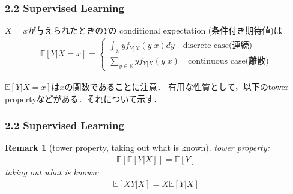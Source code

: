 \documentclass[dvipdfmx,cjk]{beamer}
\theoremstyle{example}
\newtheorem{remark}[thm]{Remark}
\begin{document}
\begin{frame}
    \frametitle{2.2 Supervised Learning}

    \begin{definition}
        $X=x$が与えられたときの$Y$の conditional expectation (条件付き期待値)は
        \begin{align*}
            \mathbb{E}[Y|X=x] =\begin{cases}
                                   \int_\mathbb{R}yf_{Y|X}(y|x)dy \quad \text{discrete case(連続)} \\
                                   \sum_{y\in\mathbb{R}}yf_{Y|X}(y|x)\quad \text{continuous case(離散)}
                               \end{cases}
        \end{align*}
    \end{definition}
    $\mathbb{E}[Y|X=x]$は$x$の関数であることに注意．
    有用な性質として，以下のtower propertyなどがある．それについて示す．
\end{frame}

\begin{frame}
    \frametitle{2.2 Supervised Learning}
    \begin{remark}[tower property, taking out what is known]
        tower property:
        \begin{align*}
            \mathbb{E}[\mathbb{E}[Y|X]] = \mathbb{E}[Y]
        \end{align*}
        taking out what is known:
        \begin{align*}
            \mathbb{E}[XY|X]=X\mathbb{E}[Y|X]
        \end{align*}
    \end{remark}
\end{frame}
\end{document}
